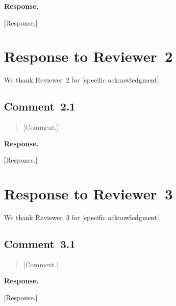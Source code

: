 \documentclass[11pt]{article}
\newenvironment{reviewercomment}{%
  \begin{quote}\color{ReviewerBlue}\itshape
}{%
  \end{quote}
}
\newenvironment{response}{%
  \noindent\textbf{Response.}\quad\ignorespaces
}{%
  \par\medskip
}
\begin{document}
\begin{response}
[Response.]
\end{response}

\section*{Response to Reviewer~2}

We thank Reviewer~2 for [specific acknowledgment].

\subsection*{Comment~2.1}

\begin{reviewercomment}
[Comment.]
\end{reviewercomment}

\begin{response}
[Response.]
\end{response}

\section*{Response to Reviewer~3}

We thank Reviewer~3 for [specific acknowledgment].

\subsection*{Comment~3.1}

\begin{reviewercomment}
[Comment.]
\end{reviewercomment}

\begin{response}
[Response.]
\end{response}

\end{document}
